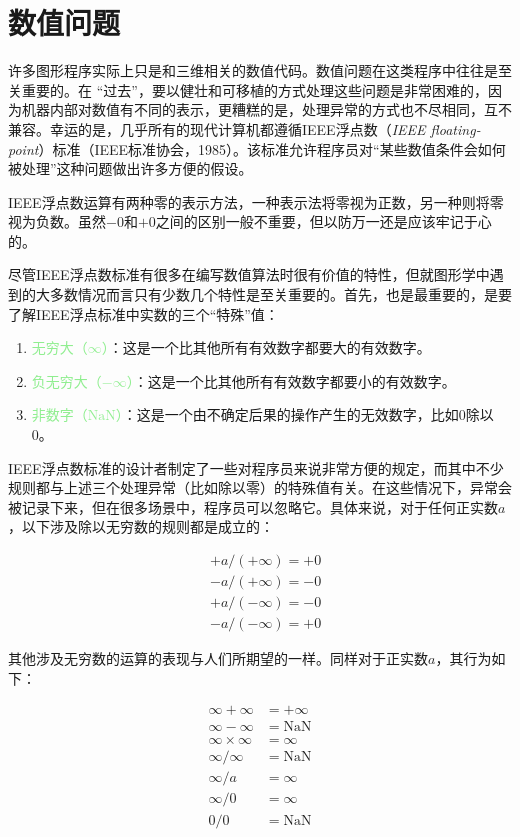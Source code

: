 \documentclass[lang=cn,12pt]{elegantbook}
\begin{document}
\section{数值问题}

许多图形程序实际上只是和三维相关的数值代码。数值问题在这类程序中往往是至关重要的。在 “过去”，要以健壮和可移植的方式处理这些问题是非常困难的，因为机器内部对数值有不同的表示，更糟糕的是，处理异常的方式也不尽相同，互不兼容。幸运的是，几乎所有的现代计算机都遵循IEEE浮点数（\textit{IEEE floating-point}）标准（IEEE标准协会，1985）。该标准允许程序员对“某些数值条件会如何被处理”这种问题做出许多方便的假设。

\begin{note}
IEEE浮点数运算有两种零的表示方法，一种表示法将零视为正数，另一种则将零视为负数。虽然$-0$和$+0$之间的区别一般不重要，但以防万一还是应该牢记于心的。
\end{note}

尽管IEEE浮点数标准有很多在编写数值算法时很有价值的特性，但就图形学中遇到的大多数情况而言只有少数几个特性是至关重要的。首先，也是最重要的，是要了解IEEE浮点标准中实数的三个“特殊”值：


\begin{enumerate}
  \item \textcolor{lightgreen}{无穷大（$\infty$）}：这是一个比其他所有有效数字都要大的有效数字。
  \item \textcolor{lightgreen}{负无穷大（$-\infty$）}：这是一个比其他所有有效数字都要小的有效数字。
  \item \textcolor{lightgreen}{非数字（$\mathrm{NaN}$）}：这是一个由不确定后果的操作产生的无效数字，比如0除以0。
\end{enumerate}

IEEE浮点数标准的设计者制定了一些对程序员来说非常方便的规定，而其中不少规则都与上述三个处理异常（比如除以零）的特殊值有关。在这些情况下，异常会被记录下来，但在很多场景中，程序员可以忽略它。具体来说，对于任何正实数$a$，以下涉及除以无穷数的规则都是成立的：

\[
  \begin{aligned}
  &+a /(+\infty)=+0 \\
  &-a /(+\infty)=-0 \\
  &+a /(-\infty)=-0 \\
  &-a /(-\infty)=+0
  \end{aligned}
\]

其他涉及无穷数的运算的表现与人们所期望的一样。同样对于正实数$a$，其行为如下：

\[
  \begin{aligned}
  \infty+\infty &=+\infty \\
  \infty-\infty &=\mathrm{NaN} \\
  \infty \times \infty &=\infty \\
  \infty / \infty &=\mathrm{NaN} \\
  \infty / a &=\infty \\
  \infty / 0 &=\infty \\
  0 / 0 &=\mathrm{NaN}
  \end{aligned}
\]
\end{document}
